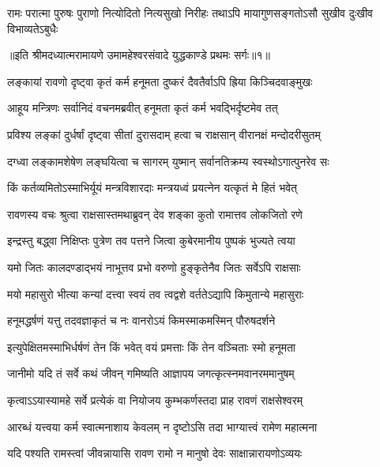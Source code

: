 \fourlineindentedshloka
{रामः परात्मा पुरुषः पुराणो}
{नित्योदितो नित्यसुखो निरीहः}
{तथाऽपि मायागुणसङ्गतोऽसौ}
{सुखीव दुःखीव विभाव्यतेऽबुधैः} %

{॥इति श्रीमदध्यात्मरामायणे उमामहेश्वरसंवादे युद्धकाण्डे
प्रथमः सर्गः॥१॥
}





\twolineshloka
{लङ्कायां रावणो दृष्ट्वा कृतं कर्म हनूमता}
{दुष्करं दैवतैर्वाऽपि ह्रिया किञ्चिदवाङ्मुखः} %

\twolineshloka
{आहूय मन्त्रिणः सर्वानिदं वचनमब्रवीत्}
{हनूमता कृतं कर्म भवद्भिर्दृष्टमेव तत्} %

\twolineshloka
{प्रविश्य लङ्कां दुर्धर्षां दृष्ट्वा सीतां दुरासदाम्}
{हत्वा च राक्षसान् वीरानक्षं मन्दोदरीसुतम्} %

\twolineshloka
{दग्ध्वा लङ्कामशेषेण लङ्घयित्वा च सागरम्}
{युष्मान् सर्वानतिक्रम्य स्वस्थोऽगात्पुनरेव सः} %

\twolineshloka
{किं कर्तव्यमितोऽस्माभिर्यूयं मन्त्रविशारदाः}
{मन्त्रयध्वं प्रयत्नेन यत्कृतं मे हितं भवेत्} %

\twolineshloka
{रावणस्य वचः श्रुत्वा राक्षसास्तमथाब्रुवन्}
{देव शङ्का कुतो रामात्तव लोकजितो रणे} %

\twolineshloka
{इन्द्रस्तु बद्ध्वा निक्षिप्तः पुत्रेण तव पत्तने}
{जित्वा कुबेरमानीय पुष्पकं भुज्यते त्वया} %

\twolineshloka
{यमो जितः कालदण्डाद्भयं नाभूत्तव प्रभो}
{वरुणो हुङ्कृतेनैव जितः सर्वेऽपि राक्षसाः} %

\twolineshloka
{मयो महासुरो भीत्या कन्यां दत्त्वा स्वयं तव}
{त्वद्वशे वर्ततेऽद्यापि किमुतान्ये महासुराः} %

\twolineshloka
{हनूमद्धर्षणं यत्तु तदवज्ञाकृतं च नः}
{वानरोऽयं किमस्माकमस्मिन् पौरुषदर्शने} %

\twolineshloka
{इत्युपेक्षितमस्माभिर्धर्षणं तेन किं भवेत्}
{वयं प्रमत्ताः किं तेन वञ्चिताः स्मो हनूमता} %

\twolineshloka
{जानीमो यदि तं सर्वे कथं जीवन् गमिष्यति}
{आज्ञापय जगत्कृत्स्नमवानरममानुषम्} %

\twolineshloka
{कृत्वाऽऽयास्यामहे सर्वे प्रत्येकं वा नियोजय}
{कुम्भकर्णस्तदा प्राह रावणं राक्षसेश्वरम्} %

\twolineshloka
{आरब्धं यत्त्वया कर्म स्वात्मनाशाय केवलम्}
{न दृष्टोऽसि तदा भाग्यात्त्वं रामेण महात्मना} %

\twolineshloka
{यदि पश्यति रामस्त्वां जीवन्नायासि रावण}
{रामो न मानुषो देवः साक्षान्नारायणोऽव्ययः} %

